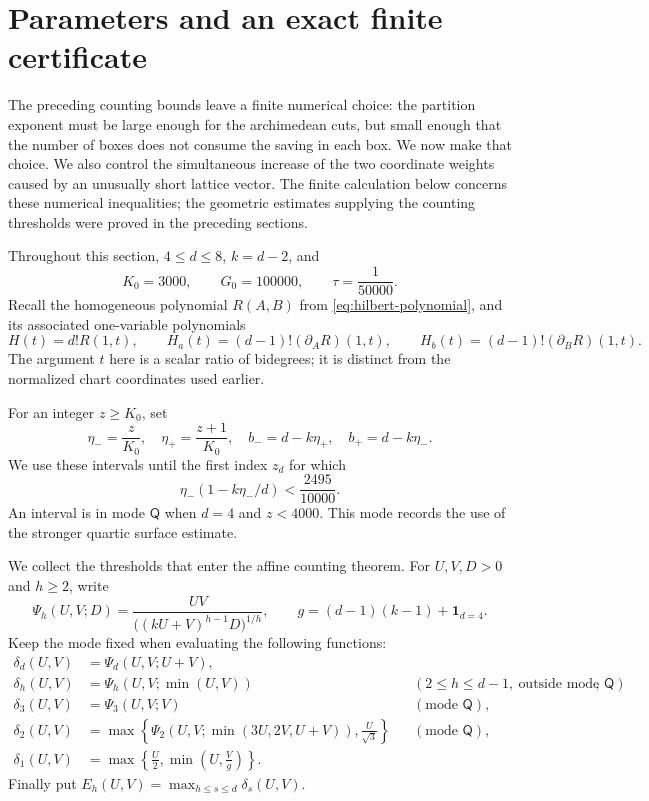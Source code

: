 \section{Parameters and an exact finite certificate}
\label{sec:parameters}

The preceding counting bounds leave a finite numerical choice: the
partition exponent must be large enough for the archimedean cuts, but
small enough that the number of boxes does not consume the saving in
each box.  We now make that choice.  We also control the simultaneous
increase of the two coordinate weights caused by an unusually short
lattice vector.  The finite calculation below concerns these numerical
inequalities; the geometric estimates supplying the counting thresholds
were proved in the preceding sections.

Throughout this section, $4\le d\le8$, $k=d-2$, and
\[
 K_0=3000,\qquad G_0=100000,\qquad \tau=\frac1{50000}.
\]
Recall the homogeneous polynomial $R(A,B)$ from
\eqref{eq:hilbert-polynomial}, and its associated one-variable
polynomials
\[
 H(t)=d!R(1,t),\qquad
 H_a(t)=(d-1)!(\partial_A R)(1,t),\qquad
 H_b(t)=(d-1)!(\partial_B R)(1,t).
\]
The argument $t$ here is a scalar ratio of bidegrees; it is distinct
from the normalized chart coordinates used earlier.

For an integer $z\ge K_0$, set
\begin{equation}
 \eta_- =\frac z{K_0},\quad
 \eta_+ =\frac{z+1}{K_0},\quad
 b_-=d-k\eta_+,\quad b_+=d-k\eta_-.
 \label{eq:parameter-interval}
\end{equation}
We use these intervals until the first index $z_d$ for which
\begin{equation}
 \eta_-(1-k\eta_-/d)<\frac{2495}{10000}.
 \label{eq:parameter-stop}
\end{equation}
An interval is in mode $\mathsf Q$ when $d=4$ and $z<4000$.
This mode records the use of the stronger quartic surface estimate.

We collect the thresholds that enter the affine counting theorem.
For $U,V,D>0$ and $h\ge2$, write
\[
 \Psi_h(U,V;D)
 =\frac{UV}{\bigl((kU+V)^{h-1}D\bigr)^{1/h}},
 \qquad g=(d-1)(k-1)+\mathbf1_{d=4}.
\]
Keep the mode fixed when evaluating the following functions:
\begin{equation}
\begin{aligned}
 \delta_d(U,V)&=\Psi_d(U,V;U+V),\\
 \delta_h(U,V)&=\Psi_h(U,V;\min(U,V))
       &&(2\le h\le d-1,\ \text{outside mode }\mathsf Q),\\
 \delta_3(U,V)&=\Psi_3(U,V;V)
       &&(\text{mode }\mathsf Q),\\
 \delta_2(U,V)&=\max\left\{
       \Psi_2(U,V;\min(3U,2V,U+V)),\frac U{\sqrt3}\right\}
       &&(\text{mode }\mathsf Q),\\
 \delta_1(U,V)&=\max\left\{\frac U2,\min\left(U,\frac Vg\right)\right\}.
\end{aligned}
\label{eq:parameter-thresholds}
\end{equation}
Finally put $E_h(U,V)=\max_{h\le s\le d}\delta_s(U,V)$.

